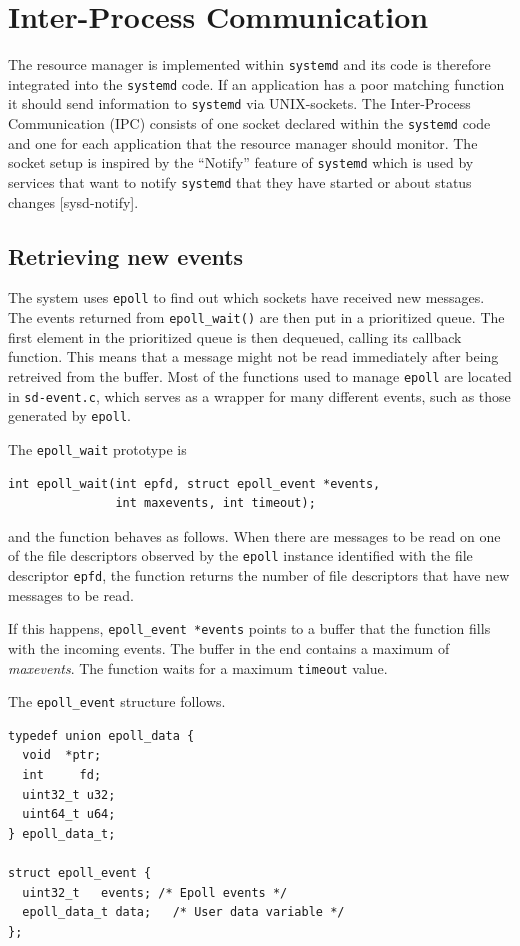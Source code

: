 \documentclass[nobiblatex]{LTHthesis}
\begin{document}
\section{Inter-Process Communication}

The resource manager is implemented within \texttt{systemd} and its code
is therefore integrated into the \texttt{systemd} code. If an application
has a poor matching function it should send information to \texttt{systemd}
via UNIX-sockets. The Inter-Process Communication (IPC) consists of one 
socket declared within the \texttt{systemd} code and one for each application
that the resource manager should monitor. 
The socket setup is inspired by the ``Notify'' feature of \texttt{systemd}
which is used by services that want to notify \texttt{systemd} that they 
have started or about status changes [sysd-notify].

\subsection{Retrieving new events}

The system uses \texttt{epoll} to find out which sockets have received new 
messages. The events returned from \texttt{epoll\_wait()} are then put in 
a prioritized queue. The first element in the prioritized queue is then 
dequeued, calling its callback function. This means that a message might 
not be read immediately after being retreived from the buffer. Most of the
functions used to manage \texttt{epoll} are located in \texttt{sd-event.c},
which serves as a wrapper for many different events, such as those generated by 
\texttt{epoll}.

The \texttt{epoll\_wait} prototype is
\begin{verbatim}
int epoll_wait(int epfd, struct epoll_event *events,
			   int maxevents, int timeout);	 
\end{verbatim}
and the function behaves as follows. When there are messages to be read on 
one of the file descriptors observed by the \texttt{epoll} instance 
identified with the file descriptor \texttt{epfd}, the function returns 
the number of file descriptors that have new messages to be read. 

If this happens, \texttt{epoll\_event *events} points to a buffer that 
the function fills with the incoming events. The buffer in the end contains
a maximum of \emph{maxevents}. The function waits for a maximum
\texttt{timeout} value.

The \texttt{epoll\_event} structure follows.
\begin{lstlisting}
typedef union epoll_data {
  void	*ptr;
  int	  fd;
  uint32_t u32;
  uint64_t u64;
} epoll_data_t;

struct epoll_event {
  uint32_t	 events; /* Epoll events */
  epoll_data_t data;   /* User data variable */
};
\end{lstlisting}
\end{document}
